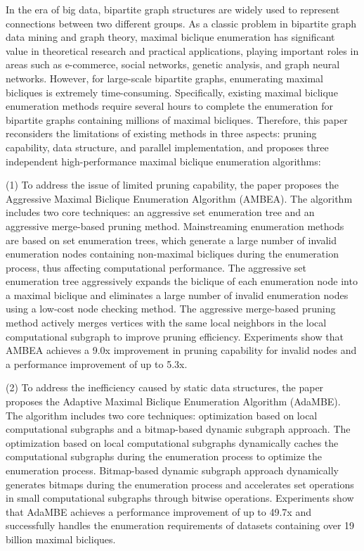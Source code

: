 In the era of big data, bipartite graph structures are widely used to represent connections between two different groups. As a classic problem in bipartite graph data mining and graph theory, maximal biclique enumeration has significant value in theoretical research and practical applications, playing important roles in areas such as e-commerce, social networks, genetic analysis, and graph neural networks. However, for large-scale bipartite graphs, enumerating maximal bicliques is extremely time-consuming. Specifically, existing maximal biclique enumeration methods require several hours to complete the enumeration for bipartite graphs containing millions of maximal bicliques. Therefore, this paper reconsiders the limitations of existing methods in three aspects: pruning capability, data structure, and parallel implementation, and proposes three independent high-performance maximal biclique enumeration algorithms:

(1) To address the issue of limited pruning capability, the paper proposes the Aggressive Maximal Biclique Enumeration Algorithm (AMBEA). The algorithm includes two core techniques: an aggressive set enumeration tree and an aggressive merge-based pruning method. Mainstreaming enumeration methods are based on set enumeration trees, which generate a large number of invalid enumeration nodes containing non-maximal bicliques during the enumeration process, thus affecting computational performance. The aggressive set enumeration tree aggressively expands the biclique of each enumeration node into a maximal biclique and eliminates a large number of invalid enumeration nodes using a low-cost node checking method. The aggressive merge-based pruning method actively merges vertices with the same local neighbors in the local computational subgraph to improve pruning efficiency. Experiments show that AMBEA achieves a 9.0x improvement in pruning capability for invalid nodes and a performance improvement of up to 5.3x.

(2) To address the inefficiency caused by static data structures, the paper proposes the Adaptive Maximal Biclique Enumeration Algorithm (AdaMBE). The algorithm includes two core techniques: optimization based on local computational subgraphs and a bitmap-based dynamic subgraph approach. The optimization based on local computational subgraphs dynamically caches the computational subgraphs during the enumeration process to optimize the enumeration process. Bitmap-based dynamic subgraph approach dynamically generates bitmaps during the enumeration process and accelerates set operations in small computational subgraphs through bitwise operations. Experiments show that AdaMBE achieves a performance improvement of up to 49.7x and successfully handles the enumeration requirements of datasets containing over 19 billion maximal bicliques.

